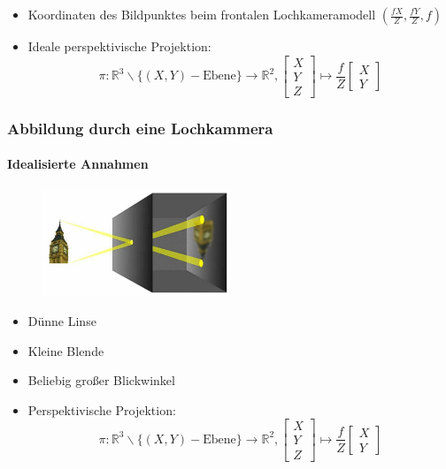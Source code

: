\documentclass[12pt, a4paper, oneside]{article}
\begin{document}
\begin{itemize}
    \item Koordinaten des Bildpunktes beim frontalen Lochkameramodell $(\frac{fX}{Z}, \frac{fY}{Z}, f)$
    \item Ideale perspektivische Projektion: 
    $$
    \pi: \mathbb{R}^3\backslash \{(X,Y)-\text{Ebene}\}\to \mathbb{R}^2, \begin{bmatrix}
        X \\
        Y \\
        Z
    \end{bmatrix} 
    \mapsto \frac{f}{Z}\begin{bmatrix}
        X \\
        Y
    \end{bmatrix}
    $$
\end{itemize}

\subsubsection{Abbildung durch eine Lochkammera}

\paragraph*{Idealisierte Annahmen}

\begin{figure}[!h]
    \centering
    \includegraphics[width=0.5\textwidth]{../img/2-5.png}
    \label{img/2-5}
\end{figure}

\begin{itemize}
    \item Dünne Linse
    \item Kleine Blende
    \item Beliebig großer Blickwinkel
    \item Perspektivische Projektion:
    $$
    \pi: \mathbb{R}^3\backslash \{(X,Y)-\text{Ebene}\}\to \mathbb{R}^2, \begin{bmatrix}
        X \\
        Y \\
        Z
    \end{bmatrix} 
    \mapsto \frac{f}{Z}\begin{bmatrix}
        X \\
        Y
    \end{bmatrix}
    $$
\end{itemize}
\end{document}
